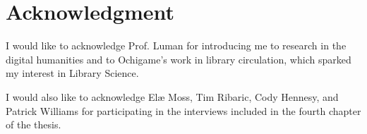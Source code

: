 \chapter*{Acknowledgment} 

I would like to acknowledge Prof. Luman for introducing me to research in the digital humanities and to Ochigame's work in library circulation, which sparked my interest in Library Science. 

I would also like to acknowledge Elæ Moss, Tim Ribaric, Cody Hennesy, and Patrick Williams for participating in the interviews included in the fourth chapter of the thesis. 

